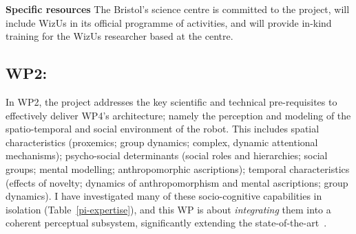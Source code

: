 \documentclass[11pt,a4paper]{report}
\newcommand{\project}{WizUs\xspace}
\begin{document}
\textbf{Specific resources} The Bristol's science centre is committed to the
project, will include \project in its official programme of activities, and will
provide in-kind training for the \project researcher based at the centre.

% 
% 
% 
% 
% 
% 
% 
% 
% 



\subsection{WP2: \textbf{\wpTwo}}


In WP2, the project addresses the key scientific and technical pre-requisites to
effectively deliver WP4's architecture; namely the perception and modeling of
the spatio-temporal and social environment of the robot. This includes spatial
characteristics (proxemics; group dynamics; complex, dynamic attentional
mechanisms); psycho-social determinants (social roles and hierarchies; social
groups; mental modelling; anthropomorphic ascriptions); temporal characteristics
(effects of novelty; dynamics of anthropomorphism and mental ascriptions; group
dynamics). I have investigated many of these socio-cognitive capabilities in
isolation (Table~\ref{pi-expertise}), and this WP is about
\emph{integrating} them into a coherent perceptual subsystem, significantly
extending the state-of-the-art~\cite{lemaignan2017artificial, baxter2016cognitive}.
\end{document}
